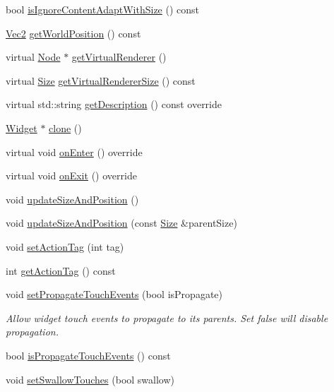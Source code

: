 \begin{DoxyCompactItemize}
bool \hyperlink{classui_1_1Widget_a6d0624feb9ef5cfbafdb71b80473390a}{is\+Ignore\+Content\+Adapt\+With\+Size} () const
\item 
\hyperlink{classVec2}{Vec2} \hyperlink{classui_1_1Widget_a312cec82d35501ebb0431ddf780dac07}{get\+World\+Position} () const
\item 
virtual \hyperlink{classNode}{Node} $\ast$ \hyperlink{classui_1_1Widget_acf862bf9235fbb3823819eeb65d46f25}{get\+Virtual\+Renderer} ()
\item 
virtual \hyperlink{classSize}{Size} \hyperlink{classui_1_1Widget_a2ed0d41565593f78dc59c975d58a869e}{get\+Virtual\+Renderer\+Size} () const
\item 
virtual std\+::string \hyperlink{classui_1_1Widget_ad85abdaa9133dc6b8efc32670ae9b93f}{get\+Description} () const override
\item 
\hyperlink{classui_1_1Widget}{Widget} $\ast$ \hyperlink{classui_1_1Widget_afe315201e215135850ef67efbfe31b81}{clone} ()
\item 
virtual void \hyperlink{classui_1_1Widget_a9cda9b9ffbf77a8ed695e6b97b9a46cc}{on\+Enter} () override
\item 
virtual void \hyperlink{classui_1_1Widget_a91cbac90873d76b6edb0e41eed5477eb}{on\+Exit} () override
\item 
void \hyperlink{classui_1_1Widget_a5c67abbcfeb1323fb80319f6db9d8e14}{update\+Size\+And\+Position} ()
\item 
void \hyperlink{classui_1_1Widget_a77fcdcda9d9affafe2a16e369ae8fb05}{update\+Size\+And\+Position} (const \hyperlink{classSize}{Size} \&parent\+Size)
\item 
void \hyperlink{classui_1_1Widget_a49aa79c6bdbcbb4d41d02e8d424826cb}{set\+Action\+Tag} (int tag)
\item 
int \hyperlink{classui_1_1Widget_abced1bc5fc63741d0625f37bf4f234c2}{get\+Action\+Tag} () const
\item 
void \hyperlink{classui_1_1Widget_a3f6b52776496c03a508df35b5cfd28f3}{set\+Propagate\+Touch\+Events} (bool is\+Propagate)
\begin{DoxyCompactList}\small\item\em Allow widget touch events to propagate to its parents. Set false will disable propagation. \end{DoxyCompactList}\item 
bool \hyperlink{classui_1_1Widget_ad4aaaf33aa2d6d06df5a50c4c50971e0}{is\+Propagate\+Touch\+Events} () const
\item 
void \hyperlink{classui_1_1Widget_a6c032c79a09975f53518172606f07c14}{set\+Swallow\+Touches} (bool swallow)

\end{DoxyCompactItemize}
